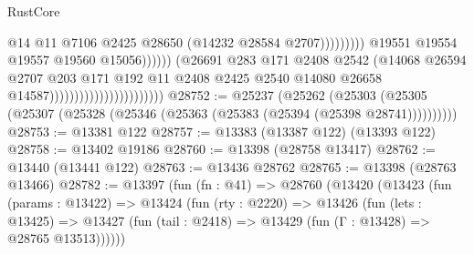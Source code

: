 \begin{lexlean}{RustCore}
\begin{coremodule}
                                                                          @14
                                                                          @11
                                                                          @7106
                                                                          @2425
                                                                          @28650
                                                                          (@14232
                                                                            @28584
                                                                            @2707)))))))))
                                                          @19551
                                                          @19554
                                                          @19557
                                                          @19560
                                                          @15056))))))
                                              (@26691
                                                @283
                                                @171
                                                @2408
                                                @2542
                                                (@14068
                                                  @26594
                                                  @2707
                                                  @203
                                                  @171
                                                  @192
                                                  @11
                                                  @2408
                                                  @2425
                                                  @2540
                                                  @14080
                                                  @26658
                                                  @14587)))))))))))))))))))))))
@28752 := @25237
    (@25262 (@25303 (@25305 (@25307 (@25328 (@25346 (@25363 (@25383 (@25394 (@25398 @28741))))))))))
@28753 := @13381 @122
@28757 := @13383 (@13387 @122) (@13393 @122)
@28758 := @13402 @19186
@28760 := @13398 (@28758 @13417)
@28762 := @13440 (@13441 @122)
@28763 := @13436 @28762
@28765 := @13398 (@28763 @13466)
@28782 := @13397
    (fun (fn : @41) =>
    @28760
      (@13420
        (@13423
          (fun (params : @13422) =>
          @13424
            (fun (rty : @2220) =>
            @13426
              (fun (lets : @13425) =>
              @13427 (fun (tail : @2418) => @13429 (fun (Γ : @13428) => @28765 @13513))))))

\end{coremodule}
\end{lexlean}

